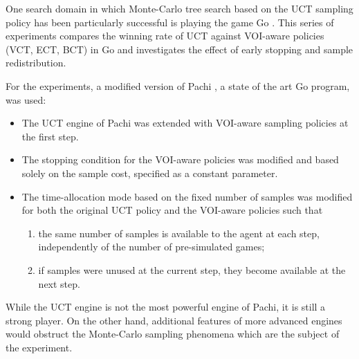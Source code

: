 \documentclass{article}
\begin{document}
One search domain in which Monte-Carlo tree search based on the UCT
sampling policy has been particularly successful is playing the game Go
\cite{Gelly.mogo}. This series of experiments compares
the winning rate of UCT against VOI-aware policies (VCT, ECT, BCT)
in Go and investigates the effect of early stopping and sample
redistribution. 

For the experiments, a modified version of Pachi \cite{Braudis.pachi},
a state of the art Go program, was used:
\begin{itemize}
\item The UCT engine of Pachi was extended with VOI-aware sampling
  policies at the first step. 
\item The stopping condition for the VOI-aware policies was
  modified and based solely on the sample cost, specified as
  a constant parameter. 
\item The time-allocation mode based on the fixed number of samples
  was modified for both the original UCT policy and the VOI-aware
  policies such that 
  \begin{enumerate}
    \item the same number of samples is available to
      the agent at each step, independently of the number of pre-simulated
      games;  
    \item if samples were unused at the current step,
      they become available at the next step. 
  \end{enumerate}
\end{itemize}
While the UCT engine is not the most powerful engine of Pachi, it is
still a strong player. On the other hand, additional features of more
advanced engines would obstruct the Monte-Carlo sampling phenomena
which are the subject of the experiment. 
\end{document}
